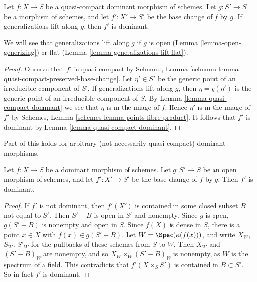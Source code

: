 \begin{lemma}
\label{lemma-base-change-dominant}
Let $f : X \to S$ be a quasi-compact dominant morphism of schemes.
Let $g : S' \to S$ be a morphism of schemes,  and let $f' : X' \to S'$
be the base change of $f$ by $g$. If generalizations lift along $g$,
then $f'$ is dominant.
\end{lemma}

\noindent
We will see that generalizations lift along $g$ if $g$ is open
(Lemma \ref{lemma-open-generizing})
or flat (Lemma \ref{lemma-generalizations-lift-flat}).

\begin{proof}
Observe that $f'$ is quasi-compact by Schemes, Lemma
\ref{schemes-lemma-quasi-compact-preserved-base-change}.
Let $\eta' \in S'$ be the generic point of an irreducible
component of $S'$. If generalizations lift along $g$,
then $\eta = g(\eta')$ is the generic point of an irreducible
component of $S$. By Lemma \ref{lemma-quasi-compact-dominant}
we see that $\eta$ is in the image of $f$.
Hence $\eta'$ is in the image of $f'$ by
Schemes, Lemma \ref{schemes-lemma-points-fibre-product}.
It follows that $f'$ is dominant by Lemma \ref{lemma-quasi-compact-dominant}.
\end{proof}

\noindent
Part of this holds for arbitrary (not necessarily quasi-compact)
dominant morphisms.

\begin{lemma}
\label{lemma-open-base-change-dominant}
Let $f : X \to S$ be a dominant morphism of schemes.
Let $g : S' \to S$ be an open morphism of schemes, and let $f' : X' \to S'$
be the base change of $f$ by $g$. Then $f'$ is dominant.
\end{lemma}

\begin{proof}
If $f'$ is not dominant, then $f'(X')$ is contained in some closed
subset $B$ not equal to $S'$. Then $S'-B$ is open in $S'$ and nonempty.
Since $g$ is open, $g(S'-B)$ is nonempty and open in $S$. Since $f(X)$
is dense in $S$, there is a point $x\in X$ with $f(x) \in g(S'-B)$.
Let $W = \Spec(\kappa (f(x)))$,
and write $X_W$, $S_W$, $S'_W$ for the pullbacks
of these schemes from $S$ to $W$. Then $X_W$ and $(S'-B)_W$ are nonempty,
and so $X_W \times_W (S'-B)_W$ is nonempty, as $W$ is the spectrum
of a field. This contradicts that $f'(X \times_S S')$ is contained
in $B \subset S'$. So in fact $f'$ is dominant.
\end{proof}

